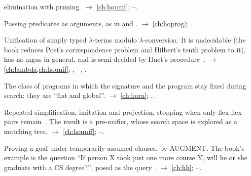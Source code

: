 \begin{glossarylist}
  elimination with pruning. $\rightarrow$ \cref{ch:hounif}; --.
\item[Higher-order programming] Passing predicates as arguments, as in  and .
  $\rightarrow$ \cref{ch:hoprog}; .
\item[Higher-order unification] Unification of simply typed $\lambda$-terms modulo $\lambda$-conversion. It is
  undecidable (the book reduces Post's correspondence problem and Hilbert's tenth problem to it), has no mgus in
  general, and is semi-decided by Huet's procedure~\cite{Huet1975}. $\rightarrow$ \cref{ch:lambda,ch:hounif};
  , --, .
\item[Horn clauses] The class of programs in which the signature and the program stay fixed during search: they are
  \enquote{flat and global}. $\rightarrow$ \cref{ch:horn}; , .
\item[Huet's procedure, pre-unification] Repeated simplification, imitation and projection, stopping when only
  flex-flex pairs remain~\cite{Huet1975}. The result is a pre-unifier, whose search space is explored as a
  matching tree. $\rightarrow$ \cref{ch:hounif}; --.
\item[Hypothetical reasoning] Proving a goal under temporarily assumed clauses, by AUGMENT. The book's example is
  the question \enquote{If person X took just one more course Y, will he or she graduate with a CS degree?}, posed as the query .
  $\rightarrow$ \cref{ch:hh}; --.
\end{glossarylist}

